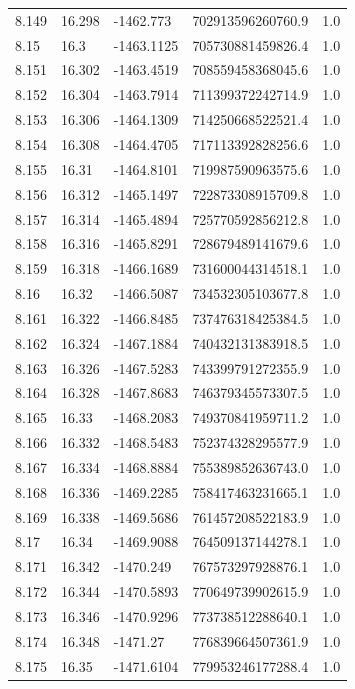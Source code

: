 \begin{tabular}{lllll}
8.149 & 16.298 & -1462.773 & 702913596260760.9 & 1.0 \\
8.15 & 16.3 & -1463.1125 & 705730881459826.4 & 1.0 \\
8.151 & 16.302 & -1463.4519 & 708559458368045.6 & 1.0 \\
8.152 & 16.304 & -1463.7914 & 711399372242714.9 & 1.0 \\
8.153 & 16.306 & -1464.1309 & 714250668522521.4 & 1.0 \\
8.154 & 16.308 & -1464.4705 & 717113392828256.6 & 1.0 \\
8.155 & 16.31 & -1464.8101 & 719987590963575.6 & 1.0 \\
8.156 & 16.312 & -1465.1497 & 722873308915709.8 & 1.0 \\
8.157 & 16.314 & -1465.4894 & 725770592856212.8 & 1.0 \\
8.158 & 16.316 & -1465.8291 & 728679489141679.6 & 1.0 \\
8.159 & 16.318 & -1466.1689 & 731600044314518.1 & 1.0 \\
8.16 & 16.32 & -1466.5087 & 734532305103677.8 & 1.0 \\
8.161 & 16.322 & -1466.8485 & 737476318425384.5 & 1.0 \\
8.162 & 16.324 & -1467.1884 & 740432131383918.5 & 1.0 \\
8.163 & 16.326 & -1467.5283 & 743399791272355.9 & 1.0 \\
8.164 & 16.328 & -1467.8683 & 746379345573307.5 & 1.0 \\
8.165 & 16.33 & -1468.2083 & 749370841959711.2 & 1.0 \\
8.166 & 16.332 & -1468.5483 & 752374328295577.9 & 1.0 \\
8.167 & 16.334 & -1468.8884 & 755389852636743.0 & 1.0 \\
8.168 & 16.336 & -1469.2285 & 758417463231665.1 & 1.0 \\
8.169 & 16.338 & -1469.5686 & 761457208522183.9 & 1.0 \\
8.17 & 16.34 & -1469.9088 & 764509137144278.1 & 1.0 \\
8.171 & 16.342 & -1470.249 & 767573297928876.1 & 1.0 \\
8.172 & 16.344 & -1470.5893 & 770649739902615.9 & 1.0 \\
8.173 & 16.346 & -1470.9296 & 773738512288640.1 & 1.0 \\
8.174 & 16.348 & -1471.27 & 776839664507361.9 & 1.0 \\
8.175 & 16.35 & -1471.6104 & 779953246177288.4 & 1.0 \\

\end{tabular}
